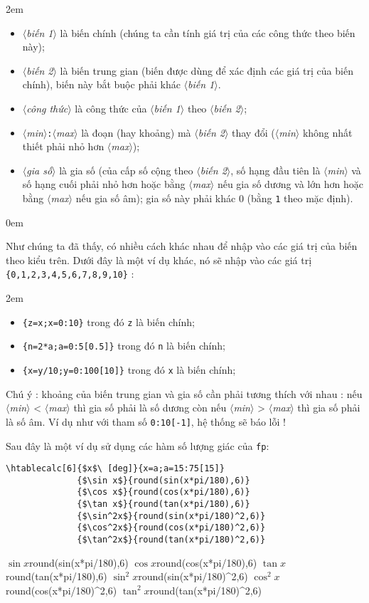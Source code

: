 \documentclass[a4paper,10pt]{article}
\newcommand\argu[1]{$\langle$\textit{#1}$\rangle$}
\newcommand\mywidth{0.85\linewidth}
\begin{document}
\parindent2em
\begin{itemize}
	\item \argu{biến 1} là biến chính (chúng ta cần tính giá trị của các công thức theo biến này);
	\item \argu{biến 2} là biến trung gian (biến được dùng để xác định các giá trị của biến chính), biến này bắt buộc phải khác \argu{biến 1}.
	\item \argu{công thức} là công thức của \argu{biến 1} theo \argu{biến 2};
	\item \argu{min}\verb|:|\argu{max} là đoạn (hay khoảng) mà \argu{biến 2} thay đổi (\argu{min} không nhất thiết phải nhỏ hơn \argu{max});
	\item \argu{gia số} là gia số (của cấp số cộng theo \argu{biến 2}, số hạng đầu tiên là \argu{min} và số hạng cuối phải nhỏ hơn hoặc bằng \argu{max} nếu gia số dương và lớn hơn hoặc bằng \argu{max} nếu gia số âm); gia số này phải khác 0 (bằng \verb=1= theo mặc định).
\end{itemize}\parindent0em
\medskip

Như chúng ta đã thấy, có nhiều cách khác nhau để nhập vào các giá trị của biến theo kiểu trên. Dưới đây là một ví dụ khác, nó sẽ nhập vào các giá trị \texttt{\{0,1,2,3,4,5,6,7,8,9,10\}} :

\parindent2em
\begin{itemize}
	\item \verb|{z=x;x=0:10}| trong đó \verb=z= là biến chính;
	\item \verb|{n=2*a;a=0:5[0.5]}| trong đó \verb=n= là biến chính;
	\item \verb|{x=y/10;y=0:100[10]}| trong đó \verb=x= là biến chính;
\end{itemize}
\parindent0pt\medskip

Chú ý : khoảng của biến trung gian và gia số cần phải tương thích với nhau : nếu \argu{min} < \argu{max} thì gia số phải là số dương còn nếu \argu{min} > \argu{max} thì gia số phải là số âm. Ví dụ như với tham số \verb|0:10[-1]|, hệ thống sẽ báo lỗi !\medskip

Sau đây là một ví dụ sử dụng các hàm số lượng giác của \verb|fp|:

\begin{center}
\begin{minipage}{\mywidth}
\begin{lstlisting}
\htablecalc[6]{$x$\ [deg]}{x=a;a=15:75[15]}
              {$\sin x$}{round(sin(x*pi/180),6)}
              {$\cos x$}{round(cos(x*pi/180),6)}
              {$\tan x$}{round(tan(x*pi/180),6)}
              {$\sin^2x$}{round(sin(x*pi/180)^2,6)}
              {$\cos^2x$}{round(cos(x*pi/180)^2,6)}
              {$\tan^2x$}{round(tan(x*pi/180)^2,6)}
\end{lstlisting}
\end{minipage}

              {$\sin x$}{round(sin(x*pi/180),6)}
              {$\cos x$}{round(cos(x*pi/180),6)}
              {$\tan x$}{round(tan(x*pi/180),6)}
              {$\sin^2x$}{round(sin(x*pi/180)^2,6)}
              {$\cos^2x$}{round(cos(x*pi/180)^2,6)}
              {$\tan^2x$}{round(tan(x*pi/180)^2,6)}
\end{center}
\medskip
\end{document}
